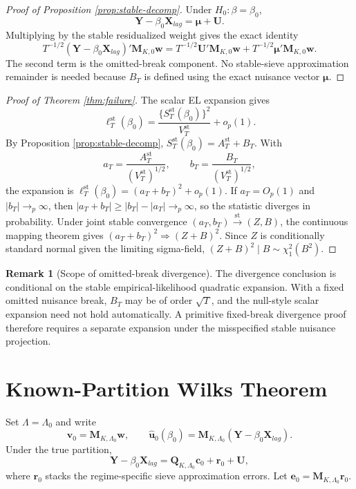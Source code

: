 \documentclass[10pt]{book}
\numberwithin{equation}{section}
\theoremstyle{definition}
\newtheorem{remark}{Remark}
\begin{document}
\begin{proof}[Proof of Proposition \ref*{prop:stable-decomp}]
Under \(H_0:\beta=\beta_0\),
\[
    \bm Y-\beta_0\bm X_{lag}=\bm\mu+\bm U.
\]
Multiplying by the stable residualized weight gives the exact identity
\[
    T^{-1/2}(\bm Y-\beta_0\bm X_{lag})'\bm M_{K,0}\bm w
    =
    T^{-1/2}\bm U'\bm M_{K,0}\bm w
    +
    T^{-1/2}\bm\mu'\bm M_{K,0}\bm w.
\]
The second term is the omitted-break component. No stable-sieve approximation remainder is needed because \(B_T\) is defined using the exact nuisance vector \(\bm\mu\).
\end{proof}

\begin{proof}[Proof of Theorem \ref*{thm:failure}]
The scalar EL expansion gives
\[
    \ell_T^{\mathrm{st}}(\beta_0)
    =
    \frac{\{S_T^{\mathrm{st}}(\beta_0)\}^2}{V_T^{\mathrm{st}}}
    +o_p(1).
\]
By Proposition \ref*{prop:stable-decomp}, \(S_T^{\mathrm{st}}(\beta_0)=A_T^{\mathrm{st}}+B_T\). With
\[
    a_T=\frac{A_T^{\mathrm{st}}}{(V_T^{\mathrm{st}})^{1/2}},
    \qquad
    b_T=\frac{B_T}{(V_T^{\mathrm{st}})^{1/2}},
\]
the expansion is \(\ell_T^{\mathrm{st}}(\beta_0)=(a_T+b_T)^2+o_p(1)\). If \(a_T=O_p(1)\) and \(|b_T|\to_p\infty\), then \(|a_T+b_T|\geq |b_T|-|a_T|\to_p\infty\), so the statistic diverges in probability. Under joint stable convergence \((a_T,b_T)\xrightarrow{\mathrm{st}}(Z,B)\), the continuous mapping theorem gives \((a_T+b_T)^2\Rightarrow (Z+B)^2\). Since \(Z\) is conditionally standard normal given the limiting sigma-field, \((Z+B)^2\mid B\sim\chi_1^2(B^2)\).
\end{proof}

\begin{remark}[Scope of omitted-break divergence]
The divergence conclusion is conditional on the stable empirical-likelihood quadratic expansion. With a fixed omitted nuisance break, \(B_T\) may be of order \(\sqrt T\), and the null-style scalar expansion need not hold automatically. A primitive fixed-break divergence proof therefore requires a separate expansion under the misspecified stable nuisance projection.
\end{remark}

\section{Known-Partition Wilks Theorem}

Set \(\Lambda=\Lambda_0\) and write
\[
    \bm v_0=\bm M_{K,\Lambda_0}\bm w,
    \qquad
    \widehat{\bm u}_0(\beta_0)
    =\bm M_{K,\Lambda_0}(\bm Y-\beta_0\bm X_{lag}).
\]
Under the true partition,
\[
    \bm Y-\beta_0\bm X_{lag}
    =
    \bm Q_{K,\Lambda_0}\bm c_0+\bm r_0+\bm U,
\]
where \(\bm r_0\) stacks the regime-specific sieve approximation errors. Let \(\bm e_0=\bm M_{K,\Lambda_0}\bm r_0\).
\end{document}

